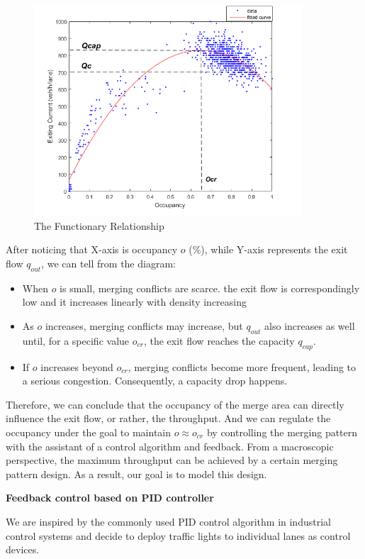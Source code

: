 \documentclass{mcmthesis}
\begin{document}
\begin{figure}[h]
\small
\centering
\includegraphics[width=10cm]{figure3}
\caption{The Functionary Relationship}\label{fig3}
\end{figure}

After noticing that X-axis is occupancy $o$ (\%), while
Y-axis represents the exit flow $q_{out}$, we can tell from
the diagram:
\begin{itemize}
\item When $o$ is small, merging conflicts are scarce.
the exit flow is correspondingly low and it
 increases linearly with density increasing
\item As $o$ increases, merging conflicts may increase, but
$q_{out}$ also increases as well until, for a specific value
$o_{cr}$, the exit flow reaches the capacity $q_{cap}$.
\item If $o$ increases beyond $o_{cr}$, merging conflicts
become more frequent, leading to a serious congestion.
Consequently, a capacity drop happens.
\end{itemize}
Therefore, we can conclude that the occupancy of the merge
area can directly influence the exit flow, or rather, the
throughput. And we can regulate the occupancy under the
goal to maintain $o  \approx  o_{cr}$ by controlling the merging
pattern with the assistant of a control algorithm and
feedback. From a macroscopic perspective, the maximum
throughput can be achieved by a certain merging pattern
design. As a result, our goal is to model this design.

\textbf{Feedback control based on PID controller}

We are inspired by the commonly used PID control algorithm in industrial
control systems and
decide to deploy traffic lights to individual lanes
as control devices.
\end{document}
